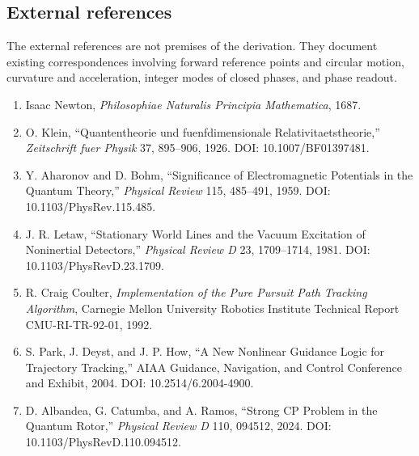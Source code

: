 \documentclass[
  10pt,
  a4paper,
]{article}
\providecommand{\tightlist}{%
  \setlength{\itemsep}{0pt}\setlength{\parskip}{0pt}}
\begin{document}
\subsection{External references}\label{external-references}

The external references are not premises of the derivation. They
document existing correspondences involving forward reference points and
circular motion, curvature and acceleration, integer modes of closed
phases, and phase readout.

\begin{enumerate}
\def\labelenumi{\arabic{enumi}.}
\setcounter{enumi}{5}
\tightlist
\item
  Isaac Newton, \emph{Philosophiae Naturalis Principia Mathematica},
  1687.
\item
  O. Klein, ``Quantentheorie und fuenfdimensionale
  Relativitaetstheorie,'' \emph{Zeitschrift fuer Physik} 37, 895--906,
  1926. DOI: 10.1007/BF01397481.
\item
  Y. Aharonov and D. Bohm, ``Significance of Electromagnetic Potentials
  in the Quantum Theory,'' \emph{Physical Review} 115, 485--491, 1959.
  DOI: 10.1103/PhysRev.115.485.
\item
  J. R. Letaw, ``Stationary World Lines and the Vacuum Excitation of
  Noninertial Detectors,'' \emph{Physical Review D} 23, 1709--1714,
  1981. DOI: 10.1103/PhysRevD.23.1709.
\item
  R. Craig Coulter, \emph{Implementation of the Pure Pursuit Path
  Tracking Algorithm}, Carnegie Mellon University Robotics Institute
  Technical Report CMU-RI-TR-92-01, 1992.
\item
  S. Park, J. Deyst, and J. P. How, ``A New Nonlinear Guidance Logic for
  Trajectory Tracking,'' AIAA Guidance, Navigation, and Control
  Conference and Exhibit, 2004. DOI: 10.2514/6.2004-4900.
\item
  D. Albandea, G. Catumba, and A. Ramos, ``Strong CP Problem in the
  Quantum Rotor,'' \emph{Physical Review D} 110, 094512, 2024. DOI:
  10.1103/PhysRevD.110.094512.
\end{enumerate}
\end{document}
